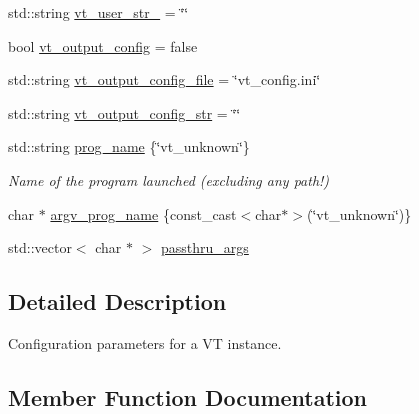 \begin{DoxyCompactItemize}
\item 
std\+::string \hyperlink{structvt_1_1arguments_1_1_app_config_a98ff430b46d126075db46ef5a9fb9c70}{vt\+\_\+user\+\_\+str\+\_} = \char`\"{}\char`\"{}
\item 
bool \hyperlink{structvt_1_1arguments_1_1_app_config_ac47e68487cbb1f9261f7d025a1f54ffb}{vt\+\_\+output\+\_\+config} = false
\item 
std\+::string \hyperlink{structvt_1_1arguments_1_1_app_config_a803ee6b8dc6ebc7eb0d3a9a603258be7}{vt\+\_\+output\+\_\+config\+\_\+file} = \char`\"{}vt\+\_\+config.\+ini\char`\"{}
\item 
std\+::string \hyperlink{structvt_1_1arguments_1_1_app_config_a1288821490b90f6ff5f07309c6d15379}{vt\+\_\+output\+\_\+config\+\_\+str} = \char`\"{}\char`\"{}
\item 
std\+::string \hyperlink{structvt_1_1arguments_1_1_app_config_ae1c980e81613c029444acf8e5433befd}{prog\+\_\+name} \{\char`\"{}vt\+\_\+unknown\char`\"{}\}
\begin{DoxyCompactList}\small\item\em Name of the program launched (excluding any path!) \end{DoxyCompactList}\item 
char $\ast$ \hyperlink{structvt_1_1arguments_1_1_app_config_a589ec3aa2327f78117c2a5de6bf91cae}{argv\+\_\+prog\+\_\+name} \{const\+\_\+cast$<$char$\ast$$>$(\char`\"{}vt\+\_\+unknown\char`\"{})\}
\item 
std\+::vector$<$ char $\ast$ $>$ \hyperlink{structvt_1_1arguments_1_1_app_config_a5db80b888a0042e18cca2182a781e178}{passthru\+\_\+args}
\end{DoxyCompactItemize}


\subsection{Detailed Description}
Configuration parameters for a VT instance. 

\subsection{Member Function Documentation}
\mbox{\label{structvt_1_1arguments_1_1_app_config_adea8d58f81c4df7df475ac9f7780decc}} 

